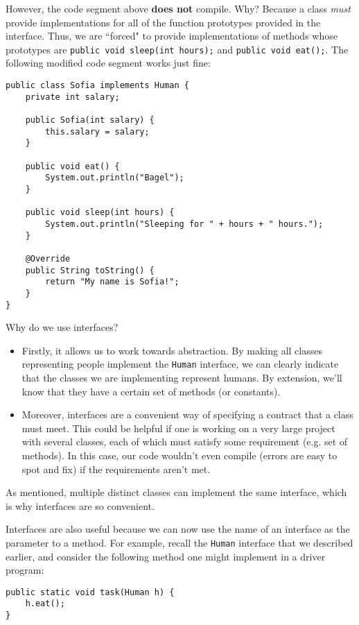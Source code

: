 However, the code segment above \textbf{does not} compile. Why? Because a class \textit{must} provide implementations for all of the function prototypes provided in the interface. Thus, we are ``forced" to provide implementations of methods whose prototypes are \verb!public void sleep(int hours);! and \verb!public void eat();!. The following modified code segment works just fine:


\begin{lstlisting}
public class Sofia implements Human {
    private int salary;
    
    public Sofia(int salary) {
        this.salary = salary;
    }
    
    public void eat() {
        System.out.println("Bagel");
    }
    
    public void sleep(int hours) {
        System.out.println("Sleeping for " + hours + " hours.");
    }
    
    @Override
    public String toString() {
        return "My name is Sofia!";
    }
}
\end{lstlisting}

Why do we use interfaces? 
\begin{itemize}
    \item Firstly, it allows us to work towards abstraction. By making all classes representing people implement the \verb!Human! interface, we can clearly indicate that the classes we are implementing represent humans. By extension, we'll know that they have a certain set of methods (or constants).
    \item Moreover, interfaces are a convenient way of specifying a contract that a class must meet. This could be helpful if one is working on a very large project with several classes, each of which must satisfy some requirement (e.g. set of methods). In this case, our code wouldn't even compile (errors are easy to spot and fix) if the requirements aren't met.
\end{itemize}

As mentioned, multiple distinct classes can implement the same interface, which is why interfaces are so convenient. 

Interfaces are also useful because we can now use the name of an interface as the parameter to a method. For example, recall the \verb!Human! interface that we described earlier, and consider the following method one might implement in a driver program:

\begin{lstlisting}
public static void task(Human h) {
    h.eat();
}
\end{lstlisting}

